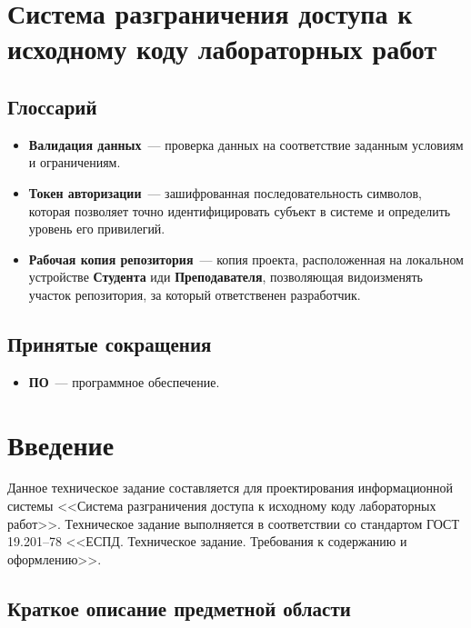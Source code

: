 \documentclass{bmstu}
\begin{document}
  \chapter*{Система разграничения доступа к исходному коду
  лабораторных работ}

  \section*{Глоссарий}

  \begin{itemize}
    \item[] \textbf{Валидация данных}~--- проверка данных на
      соответствие заданным условиям и ограничениям.
    \item[] \textbf{Токен авторизации}~--- зашифрованная
      последовательность символов, которая позволяет точно
      идентифицировать субъект в системе и определить уровень его
      привилегий.
    \item[] \textbf{Рабочая копия репозитория}~--- копия проекта, расположенная на 
    локальном устройстве \textbf{Студента} иди \textbf{Преподавателя}, позволяющая видоизменять
    участок репозитория, за который ответственен разработчик. 
  \end{itemize}

  \section*{Принятые сокращения}

  \begin{itemize}
    \item[] \textbf{ПО}~--- программное обеспечение.
  \end{itemize}

  \chapter{Введение}

  Данное техническое задание составляется для проектирования информационной системы
  <<Система разграничения доступа к исходному коду лабораторных
  работ>>.
  Техническое задание выполняется в соответствии со стандартом ГОСТ
  19.201–78 <<ЕСПД. Техническое задание. Требования к содержанию и
  оформлению>>.

  \section{Краткое описание предметной области}
\end{document}
